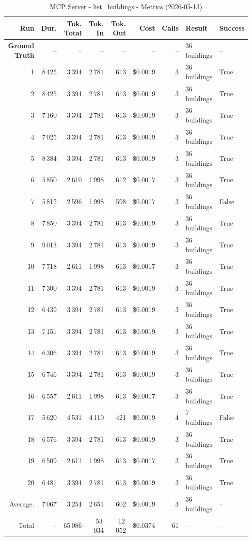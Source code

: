 \documentclass[a4paper,11pt]{article}
\begin{document}
\begin{table}[ht]
\centering
\scriptsize
\caption{MCP Server - list\_buildings - Metrics (2026-05-13)}
\label{tab:mcp\_list\_buildings\_metrics\_2026-05-13}
\begin{tabular}{r r r r r r r p{3cm} l}
\hline
Run & Dur. & Tok. Total & Tok. In & Tok. Out & Cost & Calls & Result & Success \\
\hline
\textbf{Ground Truth} & -- & -- & -- & -- & -- & -- & 36 buildings & -- \\
\hline
1 & 8\,425 & 3\,394 & 2\,781 & 613 & \$0.0019 & 3 & 36 buildings & True \\
2 & 8\,425 & 3\,394 & 2\,781 & 613 & \$0.0019 & 3 & 36 buildings & True \\
3 & 7\,160 & 3\,394 & 2\,781 & 613 & \$0.0019 & 3 & 36 buildings & True \\
4 & 7\,025 & 3\,394 & 2\,781 & 613 & \$0.0019 & 3 & 36 buildings & True \\
5 & 8\,384 & 3\,394 & 2\,781 & 613 & \$0.0019 & 3 & 36 buildings & True \\
6 & 5\,850 & 2\,610 & 1\,998 & 612 & \$0.0017 & 3 & 36 buildings & True \\
7 & 5\,812 & 2\,596 & 1\,998 & 598 & \$0.0017 & 3 & 36 buildings & False \\
8 & 7\,850 & 3\,394 & 2\,781 & 613 & \$0.0019 & 3 & 36 buildings & True \\
9 & 9\,013 & 3\,394 & 2\,781 & 613 & \$0.0019 & 3 & 36 buildings & True \\
10 & 7\,718 & 2\,611 & 1\,998 & 613 & \$0.0017 & 3 & 36 buildings & True \\
11 & 7\,300 & 3\,394 & 2\,781 & 613 & \$0.0019 & 3 & 36 buildings & True \\
12 & 6\,439 & 3\,394 & 2\,781 & 613 & \$0.0019 & 3 & 36 buildings & True \\
13 & 7\,151 & 3\,394 & 2\,781 & 613 & \$0.0019 & 3 & 36 buildings & True \\
14 & 6\,306 & 3\,394 & 2\,781 & 613 & \$0.0019 & 3 & 36 buildings & True \\
15 & 6\,746 & 3\,394 & 2\,781 & 613 & \$0.0019 & 3 & 36 buildings & True \\
16 & 6\,557 & 2\,611 & 1\,998 & 613 & \$0.0017 & 3 & 36 buildings & True \\
17 & 5\,620 & 4\,531 & 4\,110 & 421 & \$0.0019 & 4 & 7 buildings & False \\
18 & 6\,576 & 3\,394 & 2\,781 & 613 & \$0.0019 & 3 & 36 buildings & True \\
19 & 6\,509 & 2\,611 & 1\,998 & 613 & \$0.0017 & 3 & 36 buildings & True \\
20 & 6\,487 & 3\,394 & 2\,781 & 613 & \$0.0019 & 3 & 36 buildings & True \\
\hline
Average. & 7\,067 & 3\,254 & 2\,651 & 602 & \$0.0019 & 3 & 36 buildings & -- \\
Total & -- & 65\,086 & 53\,034 & 12\,052 & \$0.0374 & 61 & -- & -- \\
\hline
\end{tabular}
\end{table}
\end{document}
